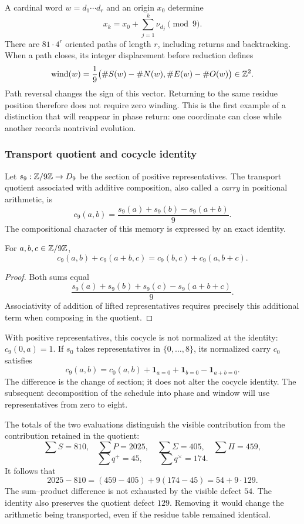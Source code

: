 A cardinal word \(w=d_1\cdots d_r\) and an origin \(x_0\) determine
\[
 x_k=x_0+\sum_{j=1}^k\nu_{d_j}\pmod9.
\]
There are \(81\cdot4^r\) oriented paths of length \(r\), including returns and backtracking. When a path closes, its integer displacement before reduction defines
\begin{equation}
 \operatorname{wind}(w)=\frac19
 \bigl(\#S(w)-\#N(w),\#E(w)-\#O(w)\bigr)\in\mathbb Z^2.
\end{equation}
Path reversal changes the sign of this vector. Returning to the same residue position therefore does not require zero winding. This is the first example of a distinction that will reappear in phase return: one coordinate can close while another records nontrivial evolution.

\subsubsection{Transport quotient and cocycle identity}

Let \(s_9:\mathbb Z/9\mathbb Z\to D_9\) be the section of positive representatives. The transport quotient associated with additive composition, also called a \emph{carry} in positional arithmetic, is
\[
 c_9(a,b)=\frac{s_9(a)+s_9(b)-s_9(a+b)}9.
\]
The compositional character of this memory is expressed by an exact identity.

\begin{lemma}
For \(a,b,c\in\mathbb Z/9\mathbb Z\),
\[
 c_9(a,b)+c_9(a+b,c)=c_9(b,c)+c_9(a,b+c).
\]
\end{lemma}
\begin{proof}
Both sums equal
\[
 \frac{s_9(a)+s_9(b)+s_9(c)-s_9(a+b+c)}9.
\]
Associativity of addition of lifted representatives requires precisely this additional term when composing in the quotient.
\end{proof}

With positive representatives, this cocycle is not normalized at the identity: \(c_9(0,a)=1\). If \(s_0\) takes representatives in \(\{0,\ldots,8\}\), its normalized carry \(c_0\) satisfies
\[
 c_9(a,b)=c_0(a,b)+\mathbf1_{a=0}+\mathbf1_{b=0}-\mathbf1_{a+b=0}.
\]
The difference is the change of section; it does not alter the cocycle identity. The subsequent decomposition of the schedule into phase and window will use representatives from zero to eight.

The totals of the two evaluations distinguish the visible contribution from the contribution retained in the quotient:
\[
 \sum S=810,\quad\sum P=2025,\quad
 \sum\Sigma=405,\quad\sum\Pi=459,
\]
\[
 \sum q^+=45,\qquad\sum q^\times=174.
\]
It follows that
\begin{equation}
 2025-810=(459-405)+9(174-45)=54+9\cdot129.
 \label{eq:defecto-integrado}
\end{equation}
The sum--product difference is not exhausted by the visible defect \(54\). The identity also preserves the quotient defect \(129\). Removing it would change the arithmetic being transported, even if the residue table remained identical.

